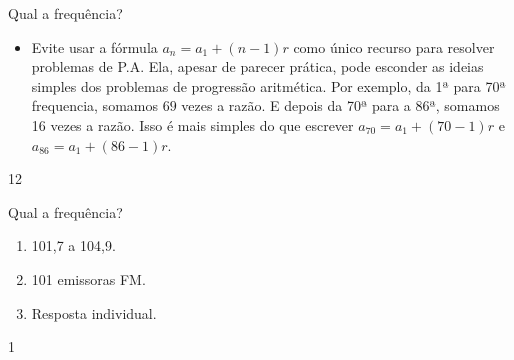 \begin{sugestions}{Qual a frequência?}
{
\begin{itemize}
\item Evite usar a fórmula $a_n=a_1+(n−1)r$ como único recurso para resolver problemas de P.A. Ela, apesar de parecer prática, pode esconder as ideias simples dos problemas de progressão aritmética. Por exemplo, da 1ª para 70ª frequencia, somamos $69$ vezes a razão. E depois da 70ª para a 86ª, somamos 16 vezes a razão. Isso é mais simples do que escrever $a_70=a_1+(70−1)r$ e $a_86=a_1+(86−1)r$.
\end{itemize}
}{1}{2}
\end{sugestions}
\begin{answer}{Qual a frequência?}
{
\begin{enumerate}

\item 101,7 a 104,9.
\item 101 emissoras FM.
\item Resposta individual.

\end{enumerate}
}{1}
\end{answer}

\label{\detokenize{AF107-6::doc}}\label{\detokenize{AF107-6:praticando}}

